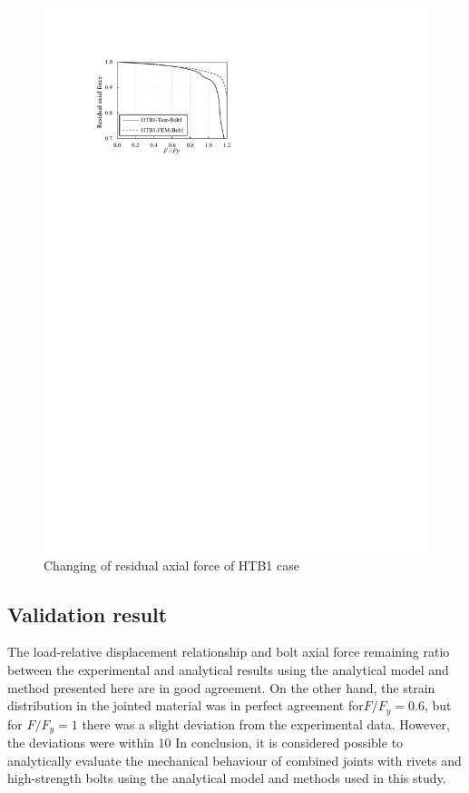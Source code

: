 \begin{figure}[htbp]
\begin{minipage}[t]{0.48\textwidth}
    \includegraphics[width=\linewidth]{imgs/ch4/figA7.pdf}
    \caption{Changing of residual axial force of HTB1 case}
    \label{ch4figA7}
    \end{minipage}
\end{figure}

\subsection{Validation result}

The load-relative displacement relationship and bolt axial force remaining ratio between the experimental and analytical results using the analytical model and method presented here are in good agreement. On the other hand, the strain distribution in the jointed material was in perfect agreement for$ F / F_y = 0.6$, but for $F / F_y = 1$ there was a slight deviation from the experimental data. However, the deviations were within 10%
In conclusion, it is considered possible to analytically evaluate the mechanical behaviour of combined joints with rivets and high-strength bolts using the analytical model and methods used in this study.


